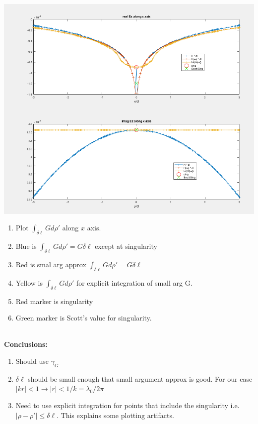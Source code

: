 \documentclass{article}
\newcommand{\0}{\varnothing}
\begin{document}
\begin{minipage}{0.5\textwidth}
{\centering
\includegraphics[width=0.95\columnwidth]{figures/GSing}
}
\end{minipage}
\begin{minipage}{0.5\textwidth}
\begin{enumerate}
    \item Plot $\int_{\delta \ell} G d\rho'$ along $x$ axis.
    \item Blue is $\int_{\delta \ell} G d\rho' = G \delta \ell$ except at singularity
    \item Red is smal arg approx $\int_{\delta \ell} G d\rho' = G \delta \ell$
    \item Yellow is $\int_{\delta \ell} G d\rho'$ for explicit integration of small arg G. 
    \item Red marker is singularity
    \item Green marker is Scott's value for singularity.
\end{enumerate}
\end{minipage}
\ \\
{\bf Conclusions:}
\begin{enumerate}
    \item Should use $\gamma_G$
    \item $\delta \ell$ should be small enough that small argument approx is good. For our case $|kr| < 1 \rightarrow |r| < 1/k = \lambda_0/2\pi$ 
    \item Need to use explicit integration for points that include the singularity i.e. $|\rho-\rho'| \le \delta \ell$. This explains some plotting artifacts.
\end{enumerate}
\end{document}
